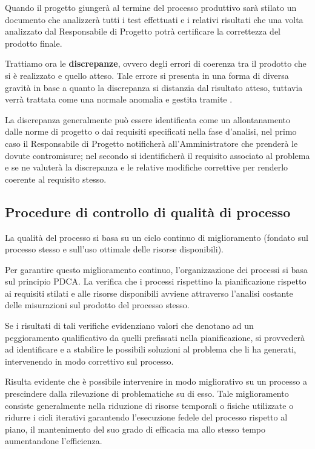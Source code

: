 Quando il progetto \caName{} giungerà al termine del processo produttivo sarà stilato un documento che analizzerà tutti i test effettuati e i relativi risultati che una volta analizzato dal Responsabile di Progetto potrà certificare la correttezza del prodotto finale.

Trattiamo ora le \textbf{discrepanze}, ovvero degli errori di coerenza tra il prodotto che si è realizzato e quello atteso. Tale errore si presenta in una forma di diversa gravità in base a quanto la discrepanza si distanzia dal risultato atteso, tuttavia verrà trattata come una normale anomalia e gestita tramite .

La discrepanza generalmente può essere identificata come un allontanamento dalle norme di progetto o dai requisiti specificati nella fase d'analisi, nel primo caso il Responsabile di Progetto notificherà all'Amministratore che prenderà le dovute contromisure; nel secondo si identificherà il requisito associato al problema e se ne valuterà la discrepanza e le relative modifiche correttive per renderlo coerente al requisito stesso.

\subsection{Procedure di controllo di qualità di processo}
La qualità del processo si basa su un ciclo continuo di miglioramento (fondato sul processo stesso e sull'uso ottimale delle risorse disponibili). 

Per garantire questo miglioramento continuo, l'organizzazione dei processi si basa sul principio PDCA\@. La verifica che i processi rispettino la pianificazione rispetto ai requisiti stilati e alle risorse disponibili avviene attraverso l'analisi costante delle misurazioni sul prodotto del processo stesso.

Se i risultati di tali verifiche evidenziano valori che denotano ad un peggioramento qualificativo da quelli prefissati nella pianificazione, si provvederà ad identificare e a stabilire le possibili soluzioni al problema che li ha generati, intervenendo in modo correttivo sul processo. \

Risulta evidente che è possibile intervenire in modo migliorativo su un processo a prescindere dalla rilevazione di problematiche su di esso. Tale miglioramento consiste generalmente nella riduzione di risorse temporali o fisiche utilizzate o ridurre i cicli iterativi garantendo l'esecuzione fedele del processo rispetto al piano, il mantenimento del suo grado di efficacia ma allo stesso tempo aumentandone l'efficienza.
\clearpage

